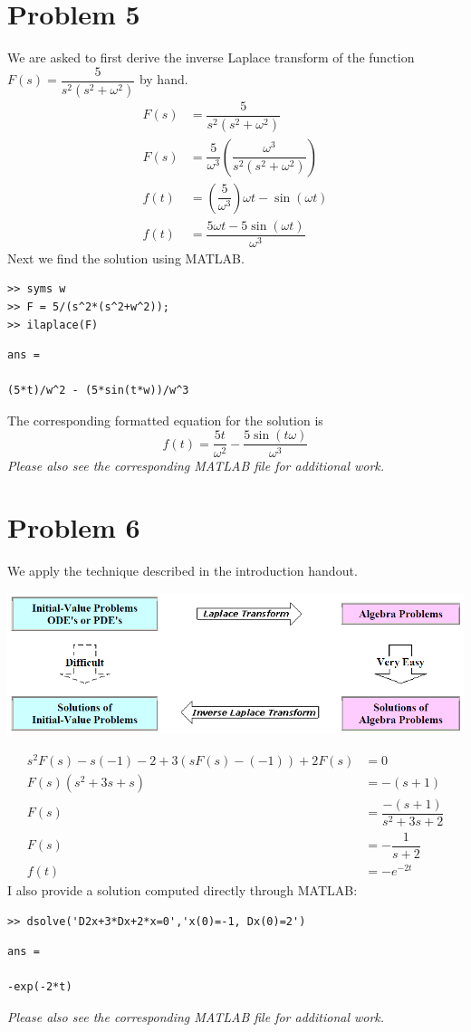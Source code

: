 \documentclass[letterpaper,10pt]{article}
\begin{document}
\section*{Problem 5}
We are asked to first derive the inverse Laplace transform of the function $F(s) = \dfrac{5}{s^2\left(s^2+\omega^2\right)}$ by hand.
\begin{align}
	F(s) &= \dfrac{5}{s^2\left(s^2+\omega^2\right)} \\
	F(s) &= \dfrac{5}{\omega^3}\left(\dfrac{\omega^3}{s^2\left(s^2+\omega^2\right)}\right) \\
	f(t) &= \left(\dfrac{5}{\omega^3}\right)\omega t-\sin(\omega t) \\
	f(t) &= \dfrac{5\omega t-5\sin(\omega t)}{\omega^3}
\end{align}
Next we find the solution using MATLAB.
\begin{verbatim}
>> syms w
>> F = 5/(s^2*(s^2+w^2));
>> ilaplace(F)
\end{verbatim}
\color{lightgray} \begin{verbatim} 
ans =
 
(5*t)/w^2 - (5*sin(t*w))/w^3
\end{verbatim} \color{black}
The corresponding formatted equation for the solution is
\begin{equation}
	f(t) = \dfrac{5t}{\omega^2} - \dfrac{5\sin(t\omega)}{\omega^3}
\end{equation}
\emph{Please also see the corresponding MATLAB file for additional work.}

\section*{Problem 6}
We apply the technique described in the introduction handout.
\begin{center}
	\includegraphics[scale=0.5]{process.png}
\end{center}
\begin{align}
	s^2F(s) - s(-1)-2+3(sF(s)-(-1))+2F(s) &= 0 \\
	F(s)(s^2+3s+s) &= -(s+1) \\
	F(s) &= \dfrac{-(s+1)}{s^2+3s+2} \\
	F(s) &= -\dfrac{1}{s+2} \\
	f(t) &= -e^{-2t}
\end{align}
I also provide a solution computed directly through MATLAB:
\begin{verbatim}
>> dsolve('D2x+3*Dx+2*x=0','x(0)=-1, Dx(0)=2')
\end{verbatim}
\color{lightgray} \begin{verbatim} 
ans =
 
-exp(-2*t) 
\end{verbatim} \color{black}
\emph{Please also see the corresponding MATLAB file for additional work.}
\end{document}
